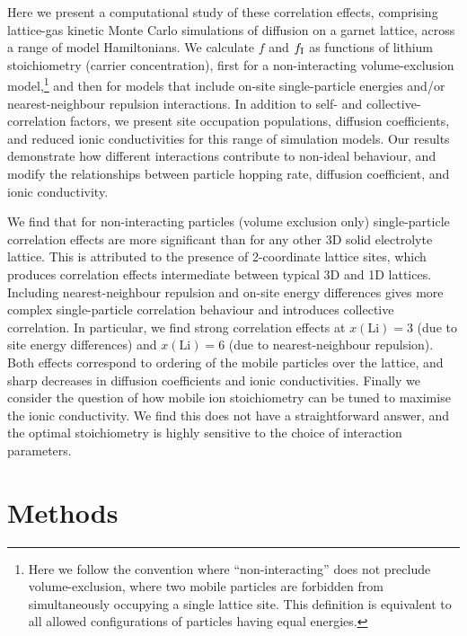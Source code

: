 \documentclass[aps,prb,twocolumn,superscriptaddress,reprint]{revtex4-1}
\begin{document}
Here we present a computational study of these correlation effects, comprising lattice-gas kinetic Monte Carlo simulations of diffusion on a garnet lattice, across a range of model Hamiltonians. 
We calculate $f$ and $f_{\mathrm{I}}$ as functions of lithium stoichiometry (carrier concentration), first for a non-interacting volume-exclusion model,\footnote{Here we follow the convention where ``non-interacting'' does not preclude volume-exclusion, where two mobile particles are forbidden from simultaneously occupying a single lattice site.\cite{Kutner_PhysLett1981} This definition is equivalent to all allowed configurations of particles having equal energies.} and then for models that include on-site single-particle energies and/or nearest-neighbour repulsion interactions. 
In addition to self- and collective-correlation factors, we present site occupation populations, diffusion coefficients, and reduced ionic conductivities for this range of simulation models. Our results demonstrate how different interactions contribute to non-ideal behaviour, and modify the relationships between particle hopping rate, diffusion coefficient, and ionic conductivity. 

We find that for non-interacting particles (volume exclusion only) single-particle correlation effects are more significant than for any other 3D solid electrolyte lattice. This is attributed to the presence of 2-coordinate lattice sites, which produces correlation effects intermediate between typical 3D and 1D lattices. Including nearest-neighbour repulsion and on-site energy differences gives more complex single-particle correlation behaviour and introduces collective correlation. In particular, we find strong correlation effects at $x(\mathrm{Li})=3$ (due to site energy differences) and $x(\mathrm{Li})=6$ (due to nearest-neighbour repulsion). Both effects correspond to ordering of the mobile particles over the lattice, and sharp decreases in diffusion coefficients and ionic conductivities. Finally we consider the question of how mobile ion stoichiometry can be tuned to maximise the ionic conductivity. We find this does not have a straightforward answer, and the optimal stoichiometry is highly sensitive to the choice of interaction parameters.

\section{Methods}
\end{document}
